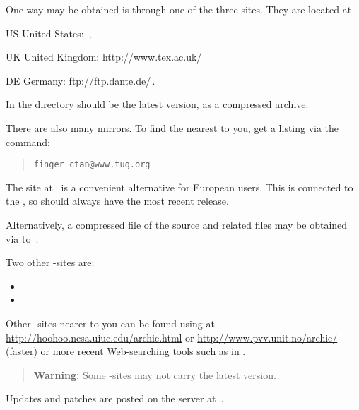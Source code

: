 \begin{changebar}%
One way \latextohtml may be obtained is through one of the three
%
{\CTANtug{}} sites.
They are located at
\begin{htmllist}
\item [US ]
United States:
\htmladdnormallinkfoot{\CTANtug{}}{\CTANtug{\CTANA}}\,,
\item [UK ]
United Kingdom:
%
{http://www.tex.ac.uk/\CTANA}
\item [DE ]
Germany:
%
{ftp://ftp.dante.de/\CTANA}\,.
\end{htmllist}
In the directory \htmladdnormallink{\CTANA/}{\CTANtug{\CTANA}}
should be the latest version, as a compressed archive.

\smallskip\noindent
There are also many mirrors.
To find the nearest to you, get a listing via the command:
\begin{quote}
\texttt{finger ctan@www.tug.org}
\end{quote}

\begin{changebar}\noindent
The site at \CVSsite\ is a convenient alternative for European users.
This is connected to the ,
so should always have the most recent release.
\end{changebar}

%
\smallskip\noindent
Alternatively, a compressed  file of the source and related files
may be obtained via  to \sourceA\,.

\smallskip\noindent
Two other -sites are:
\begin{itemize}
\item \sourceB{}
\item \sourceC{}
\end{itemize}

%
%
\smallskip\noindent
Other -sites nearer to you can be found using  at
\url{http://hoohoo.ncsa.uiuc.edu/archie.html} or
\url{http://www.pvv.unit.no/archie/} (faster)
or more recent Web-searching tools such as 
in .
\begin{quote}
\textbf{Warning: }%
Some -sites may not carry the latest version.
\end{quote}

%
\smallskip\noindent
Updates and patches are posted on the \latextohtml{} server at \patches\,.
\end{changebar}

